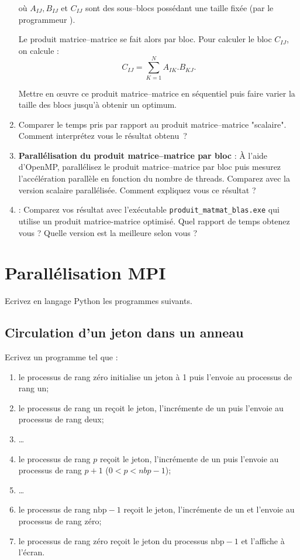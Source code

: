 \documentclass[11pt,a4paper]{article}
\begin{document}
\begin{enumerate}
où $A_{IJ},B_{IJ}$ et $C_{IJ}$ sont des sous--blocs possédant une taille fixée (par le programmeur ).

Le produit matrice--matrice se fait alors par bloc. Pour calculer le bloc $C_{IJ}$, on calcule :
\[
C_{IJ} = \sum_{K=1}^{N}A_{IK}.B_{KJ}.
\]

Mettre en {\oe}uvre ce produit matrice--matrice en séquentiel puis faire varier la taille des blocs jusqu'à obtenir un optimum.
\item Comparer le temps pris par rapport au produit matrice--matrice "scalaire". Comment interprétez vous le résultat obtenu~?

\item \textbf{\color{blue}Parallélisation du produit matrice--matrice par bloc }: \`A l'aide d'OpenMP, parallélisez le produit matrice--matrice par bloc puis mesurez l'accélération parallèle en fonction du nombre de threads. Comparez avec la version scalaire parallélisée. Comment expliquez vous ce résultat ?
\item \textbf{\color{blue}{Comparaison avec blas}}: Comparez vos résultat avec l'exécutable \texttt{produit\_matmat\_blas.exe} qui utilise un produit matrice-matrice 
                                                     optimisé. Quel rapport de temps obtenez vous ? Quelle version est la meilleure selon vous ?
\end{enumerate}

\section{Parallélisation MPI}

Ecrivez en langage Python les programmes suivants.

\subsection{Circulation d'un jeton dans un anneau}

Ecrivez un programme tel que :
\begin{enumerate}
	\item le processus de rang zéro initialise un jeton à 1 puis l'envoie au processus de rang un;
	\item le processus de rang un reçoit le jeton, l'incrémente de un puis l'envoie au processus de rang deux;
	\item \ldots
	\item le processus de rang $p$ reçoit le jeton, l'incrémente de un puis l'envoie au processus de rang $p+1$ ($0<p<nbp-1$);
	\item \ldots
	\item le processus de rang $\mbox{nbp}-1$ reçoit le jeton, l'incrémente de un et l'envoie au processus de rang zéro;
	\item le processus de rang zéro reçoit le jeton du processus $\mbox{nbp}-1$ et l'affiche à l'écran.
\end{enumerate}
\end{document}
